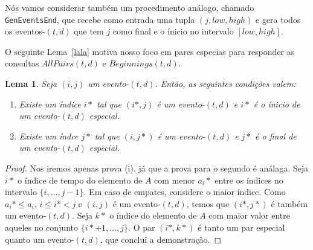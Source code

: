\documentclass[12pt]{article}
\newtheorem{lem}[thm]{Lema}
\begin{document}
\begin{figure}
\end{figure}


Nós vamos considerar também um procedimento análogo, chamado \verb|GenEventsEnd|, que recebe
como entrada uma tupla $(j, low, high)$ e gera todos os eventos-$(t,d)$ que tem $j$ como final
e o ínicio no intervalo $[low, high]$. 

O seguinte Lema~\ref{lala} motiva nosso foco em pares especias para responder as consultas
$AllPairs(t,d)$ e $Beginnings(t,d)$.

\begin{lem}  
Seja $(i, j)$ um evento-$(t,d)$. Então, as seguintes condições valem:
\begin{enumerate}
\item Existe um índice $i*$ tal que $(i*, j)$ é um evento-$(t,d)$ e $i*$ é o ínicio de um 
evento-$(t,d)$ especial. 
\item Existe um índce $j*$ tal que $(i, j*)$ é um evento-$(t,d)$ e $j*$ é o final de um
evento-$(t,d)$ especial.
\end{enumerate}
\end{lem}
\begin{proof}
Nos iremos apenas prova (i), já que a prova para o segundo é análaga. Seja $i*$ o índice
de tempo do elemento de $A$ com menor $a_i*$ entre os índices no intervalo $\{i, \ldots, j -1\}$.
Em caso de empates, considere o maior índice. Como $a_i* \le a_i$, $i \le i* < j$ e $(i, j)$ é um
evento-$(t,d)$, temos que $(i*, j*)$ é também um evento-$(t,d)$. Seja $k*$ o índice do elemento
de $A$ com maior valor entre aqueles no conjunto $\{i* + 1, \ldots, j\}$. O par $(i*, k*)$ é 
tanto um par especial quanto um evento-$(t,d)$, que conclui a demonstração.
\end{proof}
\end{document}
